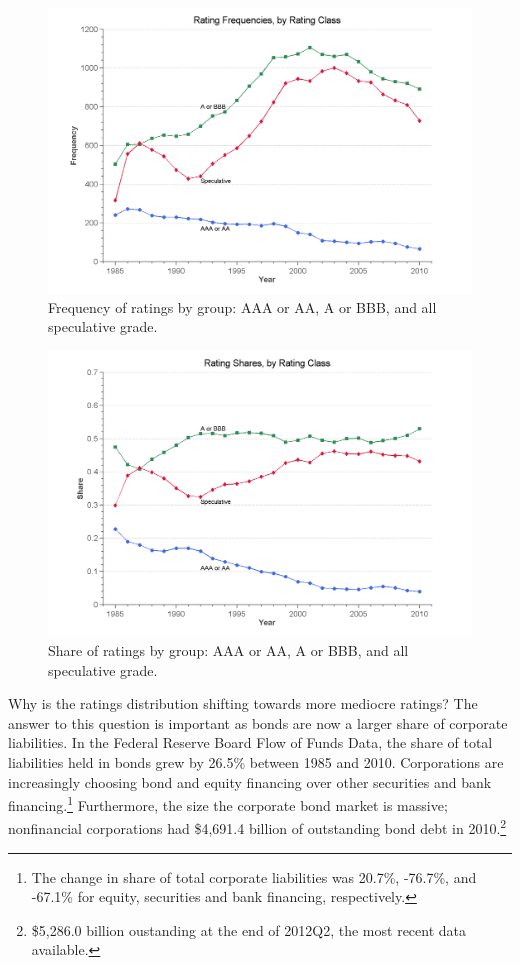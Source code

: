 \documentclass[notitlepage]{article}
\begin{document}
\begin{figure}[ht]
\centering
\includegraphics[width=\textwidth]{rate_freq.png}
\caption{Frequency of ratings by group: AAA or AA, A or BBB, and all speculative grade.}
\label{fig:count}
\end{figure}

\begin{figure}[ht]
\centering
\includegraphics[width=\textwidth]{rate_share.png}
\caption{Share of ratings by group: AAA or AA, A or BBB, and all speculative grade.}
\label{fig:share}
\end{figure}

Why is the ratings distribution shifting towards more mediocre ratings? The answer to this question is important as bonds are now a larger share of corporate liabilities. In the Federal Reserve Board Flow of Funds Data, the share of total liabilities held in bonds grew by 26.5\% between 1985 and 2010. Corporations are increasingly choosing bond and equity financing over other securities and bank financing.\footnote{The change in share of total corporate liabilities was 20.7\%, -76.7\%, and -67.1\% for equity, securities and bank financing, respectively.} Furthermore, the size the corporate bond market is massive; nonfinancial corporations had \$4,691.4 billion of outstanding bond debt in 2010.\footnote{\$5,286.0 billion oustanding at the end of 2012Q2, the most recent data available.}
\end{document}
